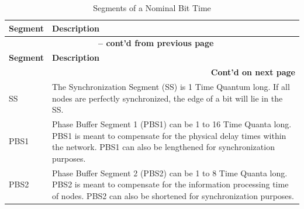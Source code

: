 \begin{longtable}[c]{| l | p{14cm} |}
    
  \caption{Segments of a Nominal Bit Time}
  \label{tab:twai-seg-of-a-nominal-bit-time} 
  \\\hline
  \rowcolor{lightgray}
    \textbf{Segment} & \textbf{Description}
  \\\hline
  \endfirsthead
  
  \multicolumn{2}{c}{\bfseries \tablename\ \thetable{} -- cont'd from previous page}\\\hline
 
  \rowcolor{lightgray}
    \textbf{Segment} & \textbf{Description}\\\hline
  \endhead
  \multicolumn{2}{r}{\textbf{Cont'd on next page}} \\
  \endfoot
  \hline
  \endlastfoot

    SS & The Synchronization Segment (SS) is 1 Time Quantum long. If all nodes are perfectly synchronized, the edge of a bit will lie in the SS.
            \\\hline
    PBS1 & Phase Buffer Segment 1 (PBS1) can be 1 to 16 Time Quanta long. PBS1 is meant to compensate for the physical delay times within the network. PBS1 can also be lengthened for synchronization purposes.
            \\\hline
    PBS2 & Phase Buffer Segment 2 (PBS2) can be 1 to 8 Time Quanta long. PBS2 is meant to compensate for the information processing time of nodes. PBS2 can also be shortened for synchronization purposes.
            \\\hline
    
\end{longtable}
